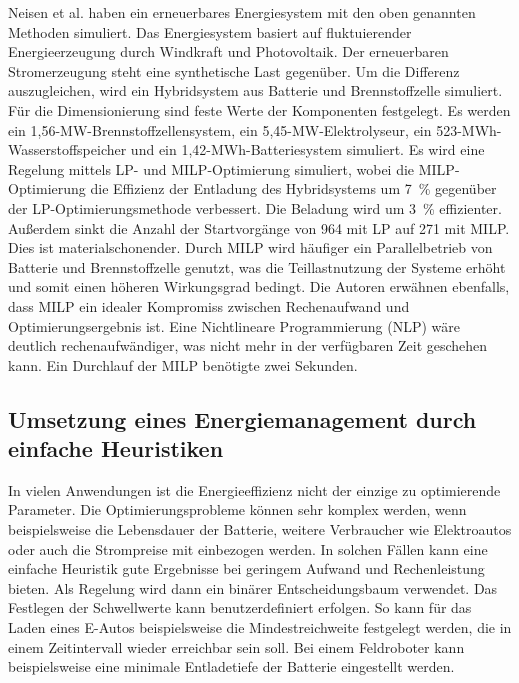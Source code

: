 Neisen et al. haben ein erneuerbares Energiesystem mit den oben genannten Methoden simuliert.
Das Energiesystem basiert auf fluktuierender Energieerzeugung durch Windkraft und Photovoltaik. Der erneuerbaren Stromerzeugung steht eine synthetische Last gegenüber. Um die Differenz auszugleichen, wird ein Hybridsystem aus Batterie und Brennstoffzelle simuliert. Für die Dimensionierung sind feste Werte der Komponenten festgelegt. Es werden ein 1,56-MW-Brennstoffzellensystem, ein 5,45-MW-Elektrolyseur, ein 523-MWh-Wasserstoffspeicher und ein 1,42-MWh-Batteriesystem simuliert. Es wird eine Regelung mittels LP- und MILP-Optimierung simuliert, wobei die MILP-Optimierung die Effizienz der Entladung des Hybridsystems um 7~\% gegenüber der LP-Optimierungsmethode verbessert. Die Beladung wird um 3~\% effizienter. Außerdem sinkt die Anzahl der Startvorgänge von 964 mit LP auf 271 mit MILP. Dies ist materialschonender. Durch MILP wird häufiger ein Parallelbetrieb von Batterie und Brennstoffzelle genutzt, was die Teillastnutzung der Systeme erhöht und somit einen höheren Wirkungsgrad bedingt. Die Autoren erwähnen ebenfalls, dass MILP ein idealer Kompromiss zwischen Rechenaufwand und Optimierungsergebnis ist. Eine Nichtlineare Programmierung (NLP) wäre deutlich rechenaufwändiger, was nicht mehr in der verfügbaren Zeit geschehen kann. Ein Durchlauf der MILP benötigte zwei Sekunden. \cite{neisen_supervisory_2018} \\

\subsection{Umsetzung eines Energiemanagement durch einfache Heuristiken}
In vielen Anwendungen ist die Energieeffizienz nicht der einzige zu optimierende Parameter. Die Optimierungsprobleme können sehr komplex werden, wenn beispielsweise die Lebensdauer der Batterie, weitere Verbraucher wie Elektroautos oder auch die Strompreise mit einbezogen werden. In solchen Fällen kann eine einfache Heuristik gute Ergebnisse bei geringem Aufwand und Rechenleistung bieten. Als Regelung wird dann ein binärer Entscheidungsbaum verwendet. Das Festlegen der Schwellwerte kann benutzerdefiniert erfolgen. So kann für das Laden eines E-Autos beispielsweise die Mindestreichweite festgelegt werden, die in einem Zeitintervall wieder erreichbar sein soll. Bei einem Feldroboter kann beispielsweise eine minimale Entladetiefe der Batterie eingestellt werden.

